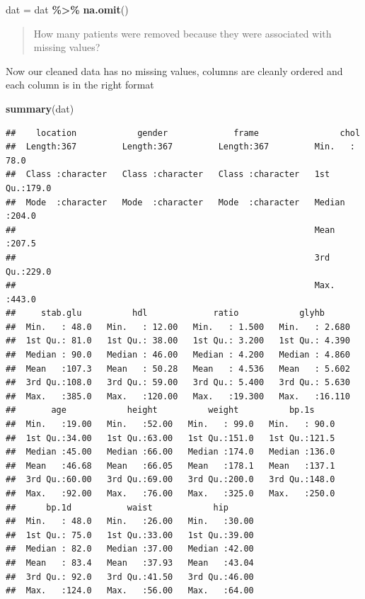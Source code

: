 \documentclass[
]{book}
\newenvironment{Shaded}{\begin{snugshade}}{\end{snugshade}}
\newcommand{\FunctionTok}[1]{\textcolor[rgb]{0.13,0.29,0.53}{\textbf{#1}}}
\newcommand{\NormalTok}[1]{#1}
\newcommand{\OtherTok}[1]{\textcolor[rgb]{0.56,0.35,0.01}{#1}}
\newcommand{\SpecialCharTok}[1]{\textcolor[rgb]{0.81,0.36,0.00}{\textbf{#1}}}
\begin{document}
\begin{Shaded}
\begin{Highlighting}[]
\NormalTok{dat }\OtherTok{=}\NormalTok{ dat }\SpecialCharTok{\%\textgreater{}\%}
  \FunctionTok{na.omit}\NormalTok{()}
\end{Highlighting}
\end{Shaded}

\begin{quote}
How many patients were removed because they were associated with missing values?
\end{quote}

Now our cleaned data has no missing values, columns are cleanly ordered and each column is in the right format

\begin{Shaded}
\begin{Highlighting}[]
\FunctionTok{summary}\NormalTok{(dat)}
\end{Highlighting}
\end{Shaded}

\begin{verbatim}
##    location            gender             frame                chol      
##  Length:367         Length:367         Length:367         Min.   : 78.0  
##  Class :character   Class :character   Class :character   1st Qu.:179.0  
##  Mode  :character   Mode  :character   Mode  :character   Median :204.0  
##                                                           Mean   :207.5  
##                                                           3rd Qu.:229.0  
##                                                           Max.   :443.0  
##     stab.glu          hdl             ratio            glyhb       
##  Min.   : 48.0   Min.   : 12.00   Min.   : 1.500   Min.   : 2.680  
##  1st Qu.: 81.0   1st Qu.: 38.00   1st Qu.: 3.200   1st Qu.: 4.390  
##  Median : 90.0   Median : 46.00   Median : 4.200   Median : 4.860  
##  Mean   :107.3   Mean   : 50.28   Mean   : 4.536   Mean   : 5.602  
##  3rd Qu.:108.0   3rd Qu.: 59.00   3rd Qu.: 5.400   3rd Qu.: 5.630  
##  Max.   :385.0   Max.   :120.00   Max.   :19.300   Max.   :16.110  
##       age            height          weight          bp.1s      
##  Min.   :19.00   Min.   :52.00   Min.   : 99.0   Min.   : 90.0  
##  1st Qu.:34.00   1st Qu.:63.00   1st Qu.:151.0   1st Qu.:121.5  
##  Median :45.00   Median :66.00   Median :174.0   Median :136.0  
##  Mean   :46.68   Mean   :66.05   Mean   :178.1   Mean   :137.1  
##  3rd Qu.:60.00   3rd Qu.:69.00   3rd Qu.:200.0   3rd Qu.:148.0  
##  Max.   :92.00   Max.   :76.00   Max.   :325.0   Max.   :250.0  
##      bp.1d           waist            hip       
##  Min.   : 48.0   Min.   :26.00   Min.   :30.00  
##  1st Qu.: 75.0   1st Qu.:33.00   1st Qu.:39.00  
##  Median : 82.0   Median :37.00   Median :42.00  
##  Mean   : 83.4   Mean   :37.93   Mean   :43.04  
##  3rd Qu.: 92.0   3rd Qu.:41.50   3rd Qu.:46.00  
##  Max.   :124.0   Max.   :56.00   Max.   :64.00
\end{verbatim}
\end{document}
